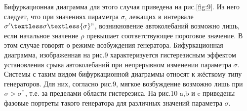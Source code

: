 Бифуркационная диаграмма для этого случая приведена на рис.\ref{fig:9}. Из него следует, что при значениях параметра $\sigma$, лежащих в интервале ${\sigma}'\textless \sigma \textless {\sigma}"$, возникновение автоколебаний возможно лишь, если начальное значение $\rho$ превышает соответствующее пороговое значение. В этом случае говорят о { режиме} возбуждения генератора. Бифуркационная диаграмма, изображенная на рис.9 характеризуется гистерезисным эффектом установления срыва автоколебаний при непрерывном изменении параметра $\sigma$. Системы с таким видом бифуркационной диаграммы относят к жёсткому типу генераторов. 
Для них, согласно рис.9, мягкое возбуждение возможно лишь при $\sigma>\sigma^"$, т.е. за пределами области гистерезиса. На рис.10 a,b и c приведены фазовые портреты такого генератора для различных значений параметра $\sigma$.

